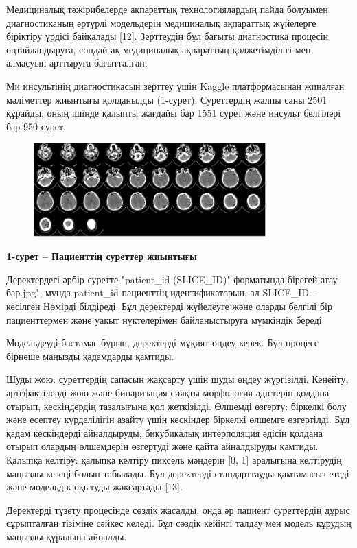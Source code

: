 Медициналық тәжірибелерде ақпараттық технологиялардың пайда болуымен
диагностиканың әртүрлі модельдерін медициналық ақпараттық жүйелерге
біріктіру үрдісі байқалады {[}12{]}. Зерттеудің бұл бағыты диагностика
процесін оңтайландыруға, сондай-ақ медициналық ақпараттың қолжетімділігі
мен алмасуын арттыруға бағытталған.

Ми инсультінің диагностикасын зерттеу үшін Kaggle платформасынан
жиналған мәліметтер жиынтығы қолданылды (1-сурет). Суреттердің жалпы
саны 2501 құрайды, оның ішінде қалыпты жағдайы бар 1551 сурет және
инсульт белгілері бар 950 сурет.

\begin{figure}[H]
	\centering
	\includegraphics[width=0.8\textwidth]{assets/1}
	\caption*{}
\end{figure}

\textbf{1-сурет -- Пациенттің суреттер жиынтығы}

Деректердегі әрбір суретте "patient\_id (SLICE\_ID)" форматында бірегей
атау бар.jpg", мұнда patient\_id пациенттің идентификаторын, ал
SLICE\_ID - кесілген Нөмірді білдіреді. Бұл деректерді жүйелеуге және
оларды белгілі бір пациенттермен және уақыт нүктелерімен байланыстыруға
мүмкіндік береді.

Модельдеуді бастамас бұрын, деректерді мұқият өңдеу керек. Бұл процесс
бірнеше маңызды қадамдарды қамтиды.

Шуды жою: суреттердің сапасын жақсарту үшін шуды өңдеу жүргізілді.
Кеңейту, артефактілерді жою және бинаризация сияқты морфология әдістерін
қолдана отырып, кескіндердің тазалығына қол жеткізілді. Өлшемді өзгерту:
біркелкі болу және есептеу күрделілігін азайту үшін кескіндер біркелкі
өлшемге өзгертілді. Бұл қадам кескіндерді айналдыруды, бикубикалық
интерполяция әдісін қолдана отырып олардың өлшемдерін өзгертуді және
қайта айналдыруды қамтиды. Қалыпқа келтіру: қалыпқа келтіру пиксель
мәндерін {[}0, 1{]} аралығына келтірудің маңызды кезеңі болып табылады.
Бұл деректерді стандарттауды қамтамасыз етеді және модельдік оқытуды
жақсартады {[}13{]}.

Деректерді түзету процесінде сөздік жасалды, онда әр пациент суреттердің
дұрыс сұрыпталған тізіміне сәйкес келеді. Бұл сөздік кейінгі талдау мен
модель құрудың маңызды құралына айналды.

